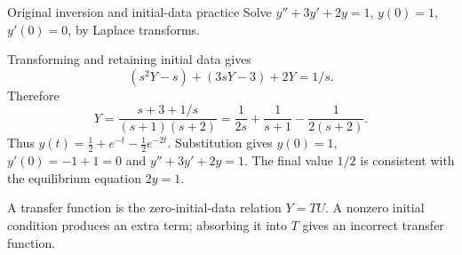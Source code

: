 \begin{question}{Original inversion and initial-data practice}
Solve $y''+3y'+2y=1$, $y(0)=1$, $y'(0)=0$, by Laplace transforms.
\end{question}
\begin{answer}
Transforming and retaining initial data gives
\[(s^2Y-s)+(3sY-3)+2Y=1/s.\]
Therefore
\[Y=\frac{s+3+1/s}{(s+1)(s+2)}=\frac1{2s}+\frac1{s+1}-\frac1{2(s+2)}.\]
Thus $y(t)=\frac12+e^{-t}-\frac12e^{-2t}$. Substitution gives $y(0)=1$, $y'(0)=-1+1=0$ and $y''+3y'+2y=1$. The final value $1/2$ is consistent with the equilibrium equation $2y=1$.
\end{answer}
\begin{tip}
A transfer function is the zero-initial-data relation $Y=T U$. A nonzero initial condition produces an extra term; absorbing it into $T$ gives an incorrect transfer function.
\end{tip}

